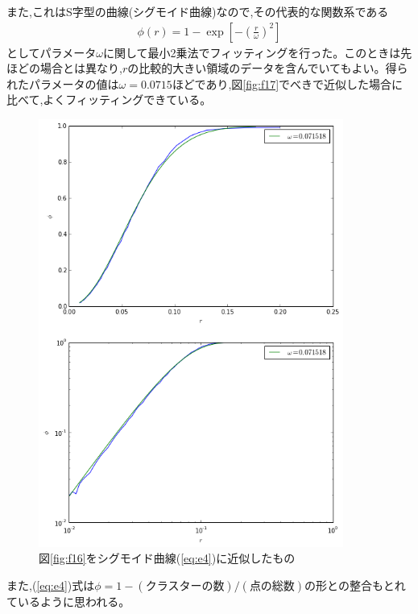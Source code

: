 また,これはS字型の曲線(シグモイド曲線)なので,その代表的な関数系である
\begin{eqnarray}\phi (r) = 1 - \exp \left[ -  \left( \frac{r}{\omega} \right)^{2} \right]\label{eq:e4}
\end{eqnarray}
としてパラメータ$\omega$に関して最小2乗法でフィッティングを行った。このときは先ほどの場合とは異なり,$r$の比較的大きい領域のデータを含んでいてもよい。得られたパラメータの値は$\omega=0.0715$ほどであり,図\ref{fig:f17}でべきで近似した場合に比べて,よくフィッティングできている。
\begin{figure}[H]
    \begin{center}
        \includegraphics[width=10cm]{../img/r_phi_1_sigmoid.png}
        \caption{図\ref{fig:f16}をシグモイド曲線(\ref{eq:e4})に近似したもの}
        \label{fig:f18}
    \end{center}
\end{figure}
また,(\ref{eq:e4})式は$\phi = 1- (\text{クラスターの数})/(\text{点の総数})$の形との整合もとれているように思われる。

